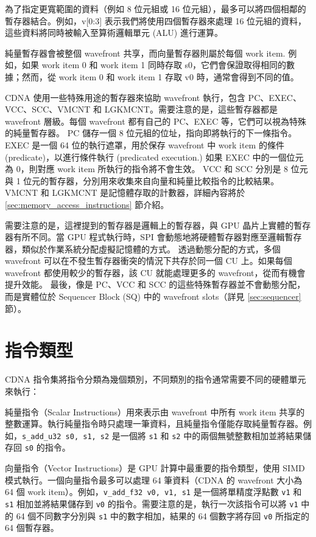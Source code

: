 為了指定更寬範圍的資料（例如 8 位元組或 16 位元組），最多可以將四個相鄰的暫存器結合。例如，v[0:3] 表示我們將使用四個暫存器來處理 16 位元組的資料，這些資料將同時被輸入至算術邏輯單元 (ALU) 進行運算。

純量暫存器會被整個 wavefront 共享，而向量暫存器則屬於每個 work item. 例如，如果 work item 0 和 work item 1 同時存取 s0，它們會保證取得相同的數據；然而，從 work item 0 和 work item 1 存取 v0 時，通常會得到不同的值。

CDNA 使用一些特殊用途的暫存器來協助 wavefront 執行，包含 PC、EXEC、VCC、SCC、VMCNT 和 LGKMCNT。需要注意的是，這些暫存器都是 wavefront 層級。每個 wavefront 都有自己的 PC、EXEC 等，它們可以視為特殊的純量暫存器。
PC 儲存一個 8 位元組的位址，指向即將執行的下一條指令。
EXEC 是一個 64 位的執行遮罩，用於保存 wavefront 中 work item 的條件 (predicate)，以進行條件執行 (predicated execution.) 如果 EXEC 中的一個位元為 0，則對應 work item 所執行的指令將不會生效。
VCC 和 SCC 分別是 8 位元與 1 位元的暫存器，分別用來收集來自向量和純量比較指令的比較結果。
VMCNT 和 LGKMCNT 是記憶體存取的計數器，詳細內容將於 \ref{sec:memory_access_instructions} 節介紹。

需要注意的是，這裡提到的暫存器是邏輯上的暫存器，與 GPU 晶片上實體的暫存器有所不同。當 GPU 程式執行時，SPI 會動態地將硬體暫存器對應至邏輯暫存器，類似於作業系統分配虛擬記憶體的方式。
透過動態分配的方式，多個 wavefront 可以在不發生暫存器衝突的情況下共存於同一個 CU 上。如果每個 wavefront 都使用較少的暫存器，該 CU 就能處理更多的 wavefront，從而有機會提升效能。
最後，像是 PC、VCC 和 SCC 的這些特殊暫存器並不會動態分配，而是實體位於 Sequencer Block (SQ) 中的 wavefront slots（詳見 \ref{sec:sequencer} 節）。


\section{指令類型}

CDNA 指令集將指令分類為幾個類別，不同類別的指令通常需要不同的硬體單元來執行：

純量指令（Scalar Instructions）用來表示由 wavefront 中所有 work item 共享的整數運算。執行純量指令時只處理一筆資料，且純量指令僅能存取純量暫存器。例如，\lstinline|s_add_u32 s0, s1, s2| 是一個將 \lstinline|s1| 和 \lstinline|s2| 中的兩個無號整數相加並將結果儲存回 \lstinline|s0| 的指令。

向量指令（Vector Instructions）是 GPU 計算中最重要的指令類型，使用 SIMD 模式執行。一個向量指令最多可以處理 64 筆資料（CDNA 的 wavefront 大小為 64 個 work item）。例如，\lstinline|v_add_f32 v0, v1, s1| 是一個將單精度浮點數 \lstinline|v1| 和 \lstinline|s1| 相加並將結果儲存到 \lstinline|v0| 的指令。需要注意的是，執行一次該指令可以將 \lstinline|v1| 中的 64 個不同數字分別與 \lstinline|s1| 中的數字相加，結果的 64 個數字將存回 \lstinline|v0| 所指定的 64 個暫存器。

